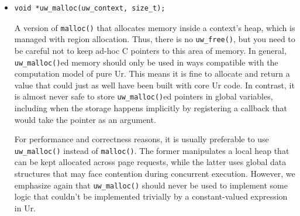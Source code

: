 \documentclass{article}
\begin{document}
\begin{itemize}
  Pending cleanup actions aren't intended to have any complex relationship amongst themselves, so, upon request handler abort, pending actions are executed in first-in-first-out order.

  \item \begin{verbatim}
void *uw_malloc(uw_context, size_t);
  \end{verbatim}
  A version of \texttt{malloc()} that allocates memory inside a context's heap, which is managed with region allocation.  Thus, there is no \texttt{uw\_free()}, but you need to be careful not to keep ad-hoc C pointers to this area of memory.  In general, \texttt{uw\_malloc()}ed memory should only be used in ways compatible with the computation model of pure Ur.  This means it is fine to allocate and return a value that could just as well have been built with core Ur code.  In contrast, it is almost never safe to store \texttt{uw\_malloc()}ed pointers in global variables, including when the storage happens implicitly by registering a callback that would take the pointer as an argument.

  For performance and correctness reasons, it is usually preferable to use \texttt{uw\_malloc()} instead of \texttt{malloc()}.  The former manipulates a local heap that can be kept allocated across page requests, while the latter uses global data structures that may face contention during concurrent execution.  However, we emphasize again that \texttt{uw\_malloc()} should never be used to implement some logic that couldn't be implemented trivially by a constant-valued expression in Ur.


\end{itemize}
\end{document}
